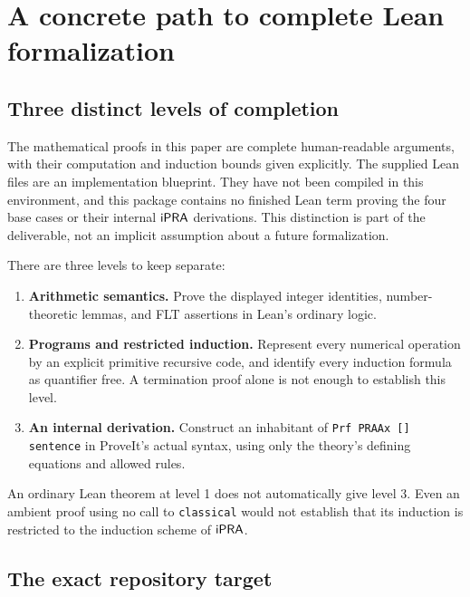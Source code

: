 \section{A concrete path to complete Lean formalization}
\label{sec:formalization}

\subsection{Three distinct levels of completion}

The mathematical proofs in this paper are complete human-readable
arguments, with their computation and induction bounds given explicitly.
The supplied Lean files are an implementation blueprint. They have not
been compiled in this environment, and this package contains no finished
Lean term proving the four base cases or their internal $\mathsf{iPRA}$
derivations. This distinction is part of the deliverable, not an implicit
assumption about a future formalization.

There are three levels to keep separate:
\begin{enumerate}
\item \textbf{Arithmetic semantics.} Prove the displayed integer identities,
number-theoretic lemmas, and FLT assertions in Lean's ordinary logic.
\item \textbf{Programs and restricted induction.} Represent every numerical
operation by an explicit primitive recursive code, and identify every
induction formula as quantifier free. A termination proof alone is not
enough to establish this level.
\item \textbf{An internal derivation.} Construct an inhabitant of
\texttt{Prf PRAAx [] sentence} in ProveIt's actual syntax, using only
the theory's defining equations and allowed rules.
\end{enumerate}
An ordinary Lean theorem at level 1 does not automatically give level 3.
Even an ambient proof using no call to \texttt{classical} would not establish
that its induction is restricted to the induction scheme of $\mathsf{iPRA}$.

\subsection{The exact repository target}

